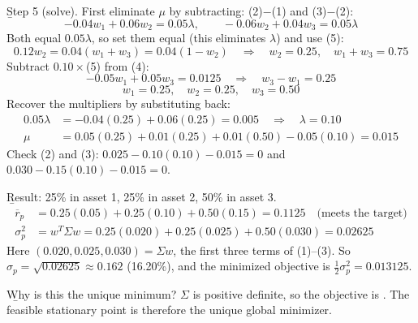 \begin{example}
    \b{Step 5} (solve). First eliminate $\mu$ by subtracting: (2)$-$(1) and (3)$-$(2):
    \[-0.04w_1 + 0.06w_2 = 0.05\lambda, \qquad -0.06w_2 + 0.04w_3 = 0.05\lambda\]
    Both equal $0.05\lambda$, so set them equal (this eliminates $\lambda$) and use (5):
    \[0.12w_2 = 0.04(w_1 + w_3) = 0.04(1 - w_2) \quad \Rightarrow \quad w_2 = 0.25, \quad w_1 + w_3 = 0.75\]
    Subtract $0.10\times$(5) from (4):
    \[-0.05w_1 + 0.05w_3 = 0.0125 \quad \Rightarrow \quad w_3 - w_1 = 0.25\]
    \[\boxed{w_1 = 0.25, \quad w_2 = 0.25, \quad w_3 = 0.50}\]
    Recover the multipliers by substituting back:
    \begin{align*}
        0.05\lambda &= -0.04(0.25) + 0.06(0.25) = 0.005 \quad \Rightarrow \quad \lambda = 0.10\\
        \mu &= 0.05(0.25) + 0.01(0.25) + 0.01(0.50) - 0.05(0.10) = 0.015
    \end{align*}
    Check (2) and (3): $0.025 - 0.10(0.10) - 0.015 = 0$ and $0.030 - 0.15(0.10) - 0.015 = 0$. \checkmark

    \b{Result}: 25\% in asset 1, 25\% in asset 2, 50\% in asset 3.
    \begin{align*}
        \overline{r}_p &= 0.25(0.05) + 0.25(0.10) + 0.50(0.15) = 0.1125 \quad \text{(meets the target)}\\
        \sigma_p^2 &= w^T\Sigma w = 0.25(0.020) + 0.25(0.025) + 0.50(0.030) = 0.02625
    \end{align*}
    Here $(0.020, 0.025, 0.030) = \Sigma w$, the first three terms of (1)--(3). So $\sigma_p = \sqrt{0.02625} \approx 0.162$ (16.20\%), and the minimized objective is $\frac{1}{2}\sigma_p^2 = 0.013125$.

    \b{Why is this the unique minimum?} $\Sigma$ is positive definite, so the objective is . The feasible stationary point is therefore the unique global minimizer.
\end{example}

